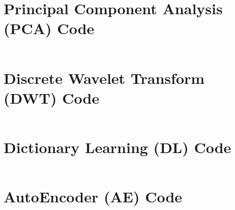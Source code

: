 \documentclass[a4paper,fleqn,12pt]{article}
\begin{document}
\pagebreak
\section{Principal Component Analysis (PCA) Code}\label{app:pca}
\inputminted[frame=lines, framesep=2mm, baselinestretch=1.2, 
             bgcolor=LightGray, fontsize=\footnotesize, linenos]
{python}{codes/pca.py}

\pagebreak
\section{Discrete Wavelet Transform (DWT) Code}\label{app:dwt}
\inputminted[frame=lines, framesep=2mm, baselinestretch=1.2, 
             bgcolor=LightGray, fontsize=\footnotesize, linenos]
{python}{codes/dwt.py}

\pagebreak
\section{Dictionary Learning (DL) Code}\label{app:dl}
\inputminted[frame=lines, framesep=2mm, baselinestretch=1.2, 
             bgcolor=LightGray, fontsize=\footnotesize, linenos]
{python}{codes/dl.py}

\pagebreak
\section{AutoEncoder (AE) Code}\label{app:ae}
\inputminted[frame=lines, framesep=2mm, baselinestretch=1.2, 
             bgcolor=LightGray, fontsize=\footnotesize, linenos]
{python}{codes/ae.py}

\pagebreak
\nolinenumbers

\end{document}
